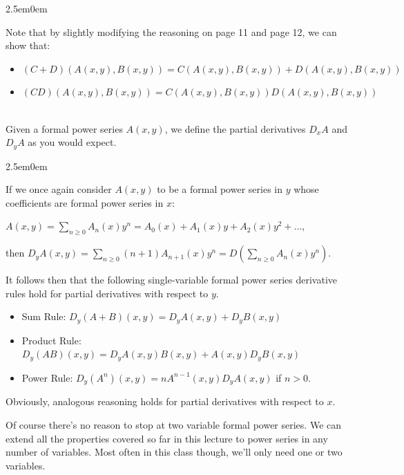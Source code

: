 \documentclass{book}
\newcommand{\hTwo}{%
\color{MidnightBlue}%
   \fontsize{13}{15}\selectfont%
}
\newcommand{\exOne}{%
   \color{Purple}%
   \fontsize{13}{15}\selectfont%
}
\newenvironment{myIndent}{%
   \begin{adjustwidth}{2.5em}{0em}%
}{%
   \end{adjustwidth}%
}
\newcommand{\mySepTwo}[1][.]{%
   {\noindent\color{#1}{\rule{6.5in}{0.5mm}}}\\%
}
\newcommand{\retTwo}{\hfill\bigbreak}
\begin{document}
\begin{myIndent}\exOne
   Note that by slightly modifying the reasoning on page 11 and page 12, we can show that:
   
   \begin{itemize}
      \item $(C + D)(A(x, y), B(x, y)) = C(A(x, y), B(x, y))  + D(A(x, y), B(x, y))$
      \item $(CD)(A(x, y), B(x, y)) = C(A(x, y), B(x, y))D(A(x, y), B(x, y))$
   \end{itemize}
\end{myIndent}

\mySepTwo

Given a formal power series $A(x, y)$, we define the partial derivatives $D_xA$ and $D_yA$ as you would expect.

\begin{myIndent}\hTwo
   If we once again consider $A(x, y)$ to be a formal power series in $y$ whose coefficients are formal power series in $x$:\\ [-10pt]
   
   {\center $A(x, y) = \sum\limits_{n\geq 0}A_n(x)y^n = A_0(x) + A_1(x)y + A_2(x)y^2 + \ldots$,\\\par}

   then $D_yA(x, y) = \sum\limits_{n\geq 0}(n+1)A_{n+1}(x)y^n = D\left(\sum\limits_{n \geq 0}A_n(x)y^n\right)$.\retTwo

   It follows then that the following single-variable formal power series derivative rules hold for partial derivatives with respect to $y$.
   \begin{itemize}
      \item Sum Rule: $D_y(A + B)(x, y) = D_yA(x, y) + D_yB(x, y)$
      \item Product Rule: $D_y(AB)(x, y) = D_yA(x, y) B(x, y) + A(x, y) D_yB(x, y)$
      \item Power Rule: $D_y(A^n)(x, y) = n A^{n-1}(x, y) D_yA(x, y)$ if $n > 0$.\retTwo
   \end{itemize}

   Obviously, analogous reasoning holds for partial derivatives with respect to $x$.\retTwo
\end{myIndent}

Of course there's no reason to stop at two variable formal power series. We can extend all the properties covered so far in this lecture to power series in any number of variables. Most often in this class though, we'll only need one or two variables.
\end{document}
